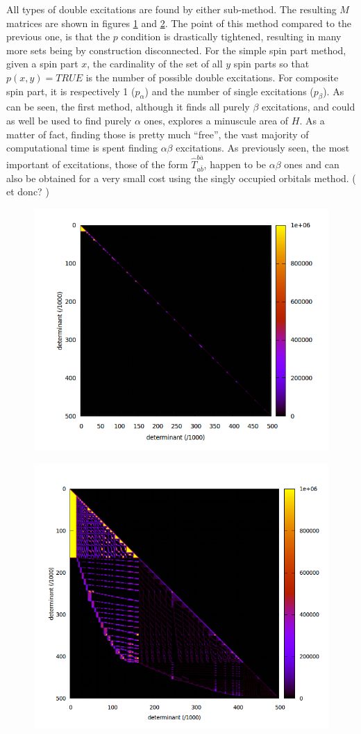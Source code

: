 All types of double excitations are found by either sub-method. The resulting $M$ matrices are shown in figures \ref{fig:aabb_subspace} and \ref{fig:ab_subspace}.
The point of this method compared to the previous one, is that the $p$ condition is drastically tightened, resulting in many more sets being by construction disconnected. For the simple spin part method, given a spin part $x$, the cardinality of the set of all $y$ spin parts so that $p(x, y) = TRUE$ is the number of possible double excitations. For composite spin part, it is respectively 1 ($p_\alpha$) and the number of single excitations ($p_\beta$).
As can be seen, the first method, although it finds all purely $\beta$ excitations, and could as well be used to find purely $\alpha$ ones, explores a minuscule area of $H$. As a matter of fact, finding those is pretty much ``free'', the vast majority of computational time is spent finding $\alpha \beta$ excitations.
As previously seen, the most important of excitations, those of the form $\hat T_{a \bar b}^{b \bar a}$, happen to be $\alpha \beta$ ones and can also be obtained for a very small cost using the singly occupied orbitals method. ( et donc? )

    
   
\begin{figure}[H]
	\begin{center}
		\includegraphics[width=0.6\columnwidth]{figures/davidson/aabb_subspace}
		\caption{{\label{fig:aabb_subspace}
		}}
	\end{center}
\end{figure}

\begin{figure}[H]
	\begin{center}
		\includegraphics[width=0.55\columnwidth]{figures/davidson/ab_subspace}
		\caption{{\label{fig:ab_subspace}
		}}
	\end{center}
\end{figure}

